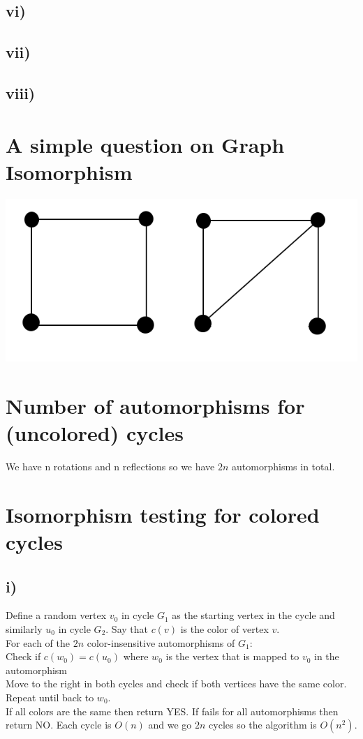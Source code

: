 \documentclass[a4paper]{article}
\begin{document}
\subsection*{vi)}
\subsection*{vii)}
\subsection*{viii)}

\section{}
\section{A simple question on Graph Isomorphism}

\includegraphics[width=\textwidth]{3}

\section{Number of automorphisms for (uncolored) cycles}
We have n rotations and n reflections so we have $2n$ automorphisms in total.
\section{Isomorphism testing for colored cycles}
\subsection*{i)}
Define a random vertex $v_0$ in cycle $G_1$ as the starting vertex in the cycle  and similarly $u_0$ in cycle $G_2$. Say that $c(v)$ is the color of vertex $v$.\\
For each of the $2n$ color-insensitive automorphisms of $G_1$:\\
Check if $c(w_0)=c(u_0)$ where $w_0$ is the vertex that is mapped to $v_0$ in the automorphism\\
Move to the right in both cycles and check if both vertices have the same color.\\
Repeat until back to $w_0$.\\
If all colors are the same then return YES.
If fails for all automorphisms then return NO.
Each cycle is $O(n)$ and we go $2n$ cycles so the algorithm is $O(n^2)$.
\end{document}

